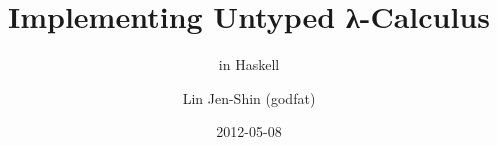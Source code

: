 \documentclass[12pt]{beamer}
\title{Implementing Untyped λ-Calculus}
\subtitle{in Haskell}
\author{Lin Jen-Shin (godfat)}
\date{2012-05-08}
\begin{document}
\frame{\titlepage}





% 
\end{document}
